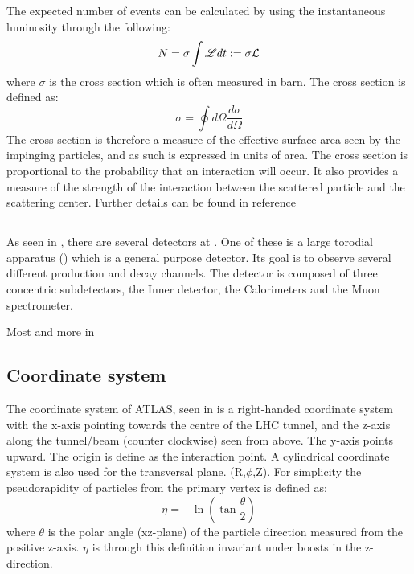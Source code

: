 The expected number of events can be calculated by using the instantaneous luminosity through the following:
\begin{equation}
N=\sigma \int \mathscr{L} dt := \sigma \mathcal{L}
\end{equation}
where $\sigma$ is the cross section which is often measured in barn.
The cross section is defined as:
\begin{equation}
\sigma = \oint d\Omega \frac{d\sigma}{d\Omega}
\end{equation}
The cross section is therefore a measure of the effective surface area seen by the impinging particles, and as such is expressed in units of area. The cross section is proportional to the probability that an interaction will occur. It also provides a measure of the strength of the interaction between the scattered particle and the scattering center.
Further details can be found in reference~\citep{Herr:2006}

\subsection{\abbrATLAS}
As seen in , there are several detectors at \abbrCERN. One of these is a large torodial \abbrLHC apparatus (\abbrATLAS) which is a general purpose detector. Its goal is to observe several different production and decay channels. The detector is composed of three concentric subdetectors, the Inner detector, the Calorimeters and the Muon spectrometer.


Most and more in \citep{1129811}
\subsection{Coordinate system}
The coordinate system of ATLAS, seen in  is a right-handed coordinate system with the x-axis pointing towards the centre of the LHC tunnel, and the z-axis along the tunnel/beam (counter clockwise) seen from above. The y-axis points upward.
The origin is define as the interaction point.
A cylindrical coordinate system is also used for the transversal plane. (R,$\phi$,Z).
For simplicity the pseudorapidity of particles from the primary vertex is defined as:
\begin{equation}
\eta = - \ln( \tan\frac{\theta}{2})
\end{equation}
where $\theta$ is the polar angle (xz-plane) of the particle direction measured from the positive z-axis. 
$\eta$ is through this definition invariant under boosts in the z-direction.

